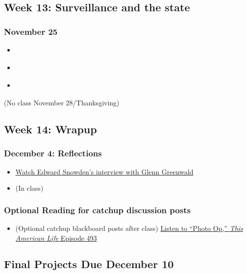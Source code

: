 \subsection{Week 13: Surveillance and the state}

\subsubsection{November 25}

\begin{itemize}
\item
  \cite{macaskill_nsa_2013}
\item
  \cite{gellman_nsa_2013}
\item
  \cite{doctorow_lockdown:_2012}
\end{itemize}

(No class November 28/Thanksgiving)

\subsection{Week 14: Wrapup}

\subsubsection{December 4: Reflections}

\begin{itemize}
\item
  \href{http://www.youtube.com/watch?v=5yB3n9fu-rM}{Watch Edward
  Snowden's interview with Glenn Greenwald}
\item
  (In class)
  \cite[ "Panopticism," pp. 200-204]{foucault_discipline_1977}
\end{itemize}

\subsubsection{Optional Reading for catchup discussion posts}

\begin{itemize}
\item
  (Optional catchup blackboard posts after class)
  \href{http://www.thisamericanlife.org/radio-archives/episode/493/picture-show?act=1}{Listen
  to ``Photo Op,'' \emph{This American Life} Episode 493}
\end{itemize}

\subsection{Final Projects Due December 10}
